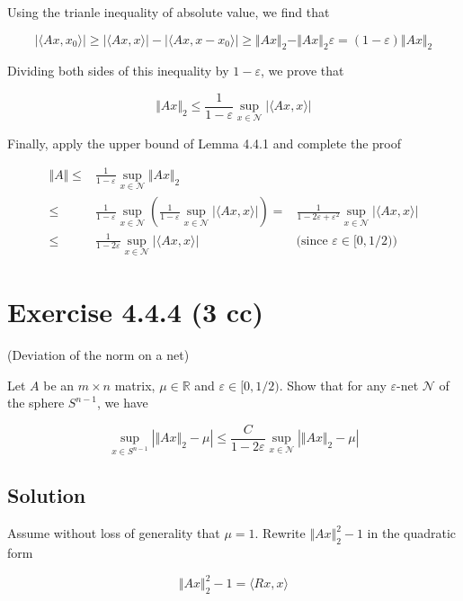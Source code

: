 \documentclass{article}
\begin{document}
Using the trianle inequality of absolute value, we find that

$$|\langle Ax, x_0 \rangle| \geq |\langle Ax, x \rangle| - |\langle Ax, x - x_0 \rangle| \geq \Vert Ax \Vert_2 - \Vert Ax \Vert_2 \varepsilon = (1 - \varepsilon) \Vert Ax \Vert_2$$

Dividing both sides of this inequality by $1 - \varepsilon$, we prove that

$$\Vert Ax \Vert_2 \leq \frac{1}{1-\varepsilon}\sup_{x \in \mathcal N}|\langle Ax, x \rangle|$$

Finally, apply the upper bound of Lemma 4.4.1 and complete the proof

\begin{equation*}
    \begin{aligned}
        \Vert A \Vert \leq & \frac{1}{1-\varepsilon}\sup_{x \in \mathcal N} \Vert Ax \Vert_2 \\ 
        \leq & \frac{1}{1-\varepsilon}\sup_{x \in \mathcal N} \left( \frac{1}{1-\varepsilon}\sup_{x \in \mathcal N}|\langle Ax, x \rangle|\right) = & \frac{1}{1-2\varepsilon+\varepsilon^2}\sup_{x \in \mathcal N}|\langle Ax, x \rangle| \\
        \leq & \frac{1}{1-2\varepsilon}\sup_{x \in \mathcal N}|\langle Ax, x \rangle| &\text{(since $\varepsilon \in [0,1/2)$)}
    \end{aligned}
\end{equation*}

\section{Exercise 4.4.4 (3 cc)}
(Deviation of the norm on a net)

Let $A$ be an $m \times n$ matrix, $\mu \in \mathbb R$ and $\varepsilon \in [0,1/2)$. Show that for any $\varepsilon$-net $\mathcal N$ of the sphere $S^{n-1}$, we have

$$\sup_{x \in S^{n-1}}|\Vert Ax \Vert_2 - \mu| \leq \frac{C}{1 - 2\varepsilon}\sup_{x \in \mathcal N}|\Vert Ax \Vert_2 - \mu|$$

\subsection{Solution}

Assume without loss of generality that $\mu = 1$. Rewrite $\Vert Ax \Vert_2^2 - 1$ in the quadratic form

$$\Vert Ax \Vert_2^2 - 1 = \langle Rx, x \rangle$$
\end{document}
